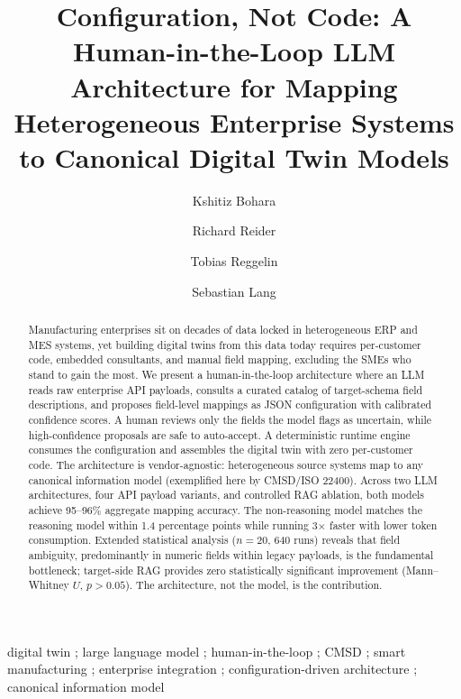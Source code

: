 \documentclass[3p,times,procedia]{elsarticle}
\begin{document}
\begin{frontmatter}


\title{Configuration, Not Code: A Human-in-the-Loop LLM Architecture for Mapping Heterogeneous Enterprise Systems to Canonical Digital Twin Models}

\author[a]{Kshitiz Bohara}
\author[a]{Richard Reider}
\author[a]{Tobias Reggelin}
\author[a,b]{Sebastian Lang}

\address[a]{Institute for Engineering of Products and Systems, Otto-Von-Guericke-University Magdeburg,
GERMANY}
\address[b]{Fraunhofer Institute for Factory Operation and Automation IFF, Magdeburg, Germany}

\begin{abstract}
Manufacturing enterprises sit on decades of data locked in heterogeneous ERP and MES systems, yet building digital twins from this data today requires per-customer code, embedded consultants, and manual field mapping, excluding the SMEs who stand to gain the most. We present a human-in-the-loop architecture where an LLM reads raw enterprise API payloads, consults a curated catalog of target-schema field descriptions, and proposes field-level mappings as JSON configuration with calibrated confidence scores. A human reviews only the fields the model flags as uncertain, while high-confidence proposals are safe to auto-accept. A deterministic runtime engine consumes the configuration and assembles the digital twin with zero per-customer code. The architecture is vendor-agnostic: heterogeneous source systems map to any canonical information model (exemplified here by CMSD/ISO 22400). Across two LLM architectures, four API payload variants, and controlled RAG ablation, both models achieve 95--96\% aggregate mapping accuracy. The non-reasoning model matches the reasoning model within 1.4 percentage points while running 3$\times$ faster with lower token consumption. Extended statistical analysis ($n=20$, 640 runs) reveals that field ambiguity, predominantly in numeric fields within legacy payloads, is the fundamental bottleneck; target-side RAG provides zero statistically significant improvement (Mann--Whitney $U$, $p > 0.05$). The architecture, not the model, is the contribution.
\end{abstract}

\begin{keyword}
digital twin ; large language model ; human-in-the-loop ; CMSD ; smart manufacturing ; enterprise integration ; configuration-driven architecture ; canonical information model
\end{keyword}
\end{frontmatter}
\end{document}
